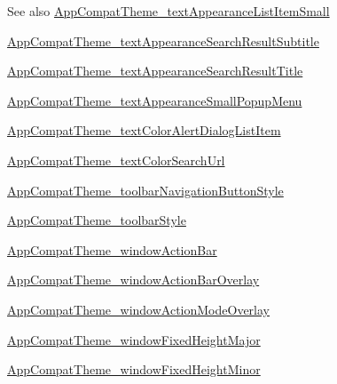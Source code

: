 \begin{DoxySeeAlso}{See also}
\hyperlink{classandroid_1_1support_1_1v7_1_1cardview_1_1R_1_1styleable_a0dbb87b74ed823cda913ce4dc15a0df3}{App\+Compat\+Theme\+\_\+text\+Appearance\+List\+Item\+Small} 

\hyperlink{classandroid_1_1support_1_1v7_1_1cardview_1_1R_1_1styleable_a5c6429ab74191c03ded7047f5aa85f30}{App\+Compat\+Theme\+\_\+text\+Appearance\+Search\+Result\+Subtitle} 

\hyperlink{classandroid_1_1support_1_1v7_1_1cardview_1_1R_1_1styleable_a1b75dd408c582ec70493e7f69ec4ad8e}{App\+Compat\+Theme\+\_\+text\+Appearance\+Search\+Result\+Title} 

\hyperlink{classandroid_1_1support_1_1v7_1_1cardview_1_1R_1_1styleable_a5c5300533d341ed70cf8866e7cea0fab}{App\+Compat\+Theme\+\_\+text\+Appearance\+Small\+Popup\+Menu} 

\hyperlink{classandroid_1_1support_1_1v7_1_1cardview_1_1R_1_1styleable_a730df5f1aaa02f6f44026aa8cd716f2a}{App\+Compat\+Theme\+\_\+text\+Color\+Alert\+Dialog\+List\+Item} 

\hyperlink{classandroid_1_1support_1_1v7_1_1cardview_1_1R_1_1styleable_af07efe85225b786325d19d1acd12a0a9}{App\+Compat\+Theme\+\_\+text\+Color\+Search\+Url} 

\hyperlink{classandroid_1_1support_1_1v7_1_1cardview_1_1R_1_1styleable_a6ccca53fe196080e3926237eed8f3b67}{App\+Compat\+Theme\+\_\+toolbar\+Navigation\+Button\+Style} 

\hyperlink{classandroid_1_1support_1_1v7_1_1cardview_1_1R_1_1styleable_ad3252ce0472f8a493dfefb321b238ec9}{App\+Compat\+Theme\+\_\+toolbar\+Style} 

\hyperlink{classandroid_1_1support_1_1v7_1_1cardview_1_1R_1_1styleable_a447b7ac42a9d74fe8464e5d6fdeaba6c}{App\+Compat\+Theme\+\_\+window\+Action\+Bar} 

\hyperlink{classandroid_1_1support_1_1v7_1_1cardview_1_1R_1_1styleable_a283227c3d60e7ad20f595ff0f405c274}{App\+Compat\+Theme\+\_\+window\+Action\+Bar\+Overlay} 

\hyperlink{classandroid_1_1support_1_1v7_1_1cardview_1_1R_1_1styleable_a2e20d285d36c8aee404b1d719af3b081}{App\+Compat\+Theme\+\_\+window\+Action\+Mode\+Overlay} 

\hyperlink{classandroid_1_1support_1_1v7_1_1cardview_1_1R_1_1styleable_af7d8d8ae32e20793c811cd2892bd854b}{App\+Compat\+Theme\+\_\+window\+Fixed\+Height\+Major} 

\hyperlink{classandroid_1_1support_1_1v7_1_1cardview_1_1R_1_1styleable_aab3ebd33291947ab919499cc329066b8}{App\+Compat\+Theme\+\_\+window\+Fixed\+Height\+Minor} 


\end{DoxySeeAlso}
